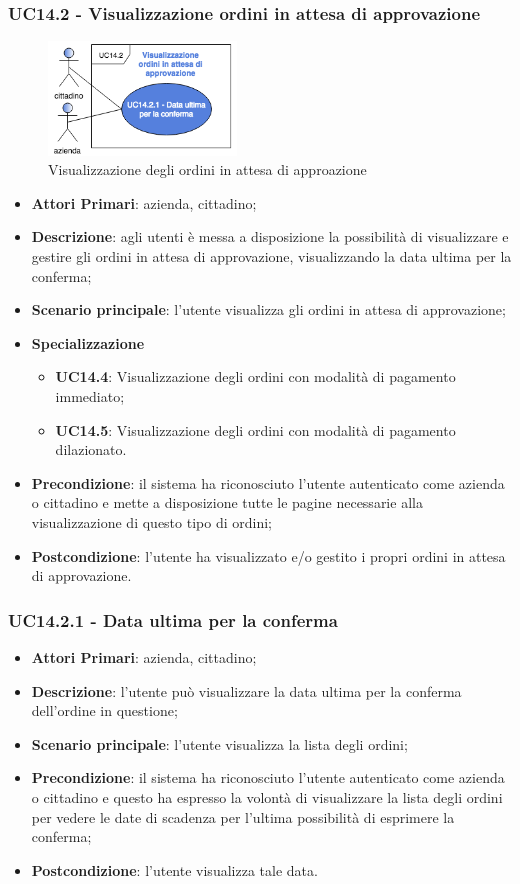 \subsubsection{UC14.2 - Visualizzazione ordini in attesa di approvazione}
\begin{figure}[H]
	\includegraphics[width=5cm]{res/images/UC14-2.png}
	\centering
	\caption{Visualizzazione degli ordini in attesa di approazione}
\end{figure}
\begin{itemize}
	\item \textbf{Attori Primari}: azienda, cittadino;
	\item \textbf{Descrizione}: agli utenti è messa a disposizione la possibilità di visualizzare e gestire gli ordini in attesa di approvazione, visualizzando la data ultima per la conferma;
	\item \textbf{Scenario principale}: l'utente visualizza gli ordini in attesa di approvazione;
		\item \textbf{Specializzazione}
	\begin{itemize}
		\item \textbf{UC14.4}: Visualizzazione degli ordini con modalità di pagamento immediato;
		\item \textbf{UC14.5}: Visualizzazione degli ordini con modalità di pagamento dilazionato.
	\end{itemize}
	\item \textbf{Precondizione}: il sistema ha riconosciuto l'utente autenticato come azienda o cittadino e mette a disposizione tutte le pagine necessarie alla visualizzazione di questo tipo di ordini;
	\item \textbf{Postcondizione}: l'utente ha visualizzato e/o gestito i propri ordini in attesa di approvazione.
\end{itemize} 

\subsubsection{UC14.2.1 - Data ultima per la conferma}
\begin{itemize}
	\item \textbf{Attori Primari}: azienda, cittadino;
	\item \textbf{Descrizione}: l'utente può visualizzare la data ultima per la conferma dell'ordine in questione;
	\item \textbf{Scenario principale}: l'utente visualizza la lista degli ordini;
	\item \textbf{Precondizione}: il sistema ha riconosciuto l'utente autenticato come azienda o cittadino e questo ha espresso la volontà di visualizzare la lista degli ordini per vedere le date di scadenza per l'ultima possibilità di esprimere la conferma;
	\item \textbf{Postcondizione}: l'utente visualizza tale data.
\end{itemize}

